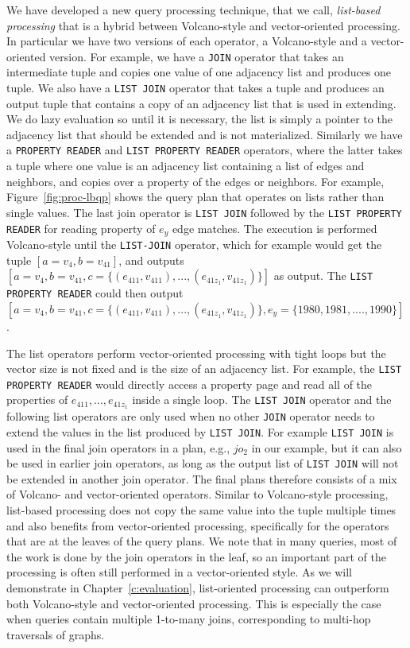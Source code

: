 We have developed a new query processing technique, that we call, {\em list-based processing} that is a hybrid between Volcano-style and vector-oriented processing. In particular we have two versions of each operator, a Volcano-style and a vector-oriented version. For example, we have a \texttt{JOIN} operator that takes an intermediate tuple and copies one value of one adjacency list and produces one tuple. We also have a \texttt{LIST JOIN} operator that takes a tuple and produces an output tuple that contains a copy of an adjacency list that is used in extending. We do lazy evaluation so until it is necessary, the list is simply a pointer to the adjacency list that should be extended and is not materialized. Similarly we have a \texttt{PROPERTY READER} and \texttt{LIST PROPERTY READER} operators, where the latter takes a tuple where one value is an adjacency list containing a list of edges and neighbors, and copies over a property of the edges or neighbors. For example, Figure~\ref{fig:proc-lbqp} shows the query plan that operates on lists rather than single values. The last join operator is \texttt{LIST JOIN} followed by the \texttt{LIST PROPERTY READER} for reading property of $e_y$ edge matches. The execution is performed Volcano-style until the \texttt{LIST-JOIN} operator, which for example would get the tuple $[a=v_4, b=v_{41}]$, and outputs $[a=v_4, b=v_{41}, c=\{(e_{411}, v_{411}), ..., (e_{41z_1}, v_{41z_1})\}]$ as output. The \texttt{LIST PROPERTY READER} could then output  $[a=v_4, b=v_{41}, c=\{(e_{411}, v_{411}), ..., (e_{41z_1}, v_{41z_1})\}, e_y=\{1980, 1981, ...., 1990\}]$. 

The list operators perform vector-oriented processing with tight loops but the vector size is not fixed and is the size of an adjacency list. For example, the \texttt{LIST PROPERTY READER} would directly access a property page and read all of the properties of $e_{411}, ..., e_{41z_1}$ inside a single loop. The \texttt{LIST JOIN} operator and the following list operators are only used when no other \texttt{JOIN} operator needs to extend the values in the list produced by \texttt{LIST JOIN}. For example \texttt{LIST JOIN} is used in the final join operators in a plan, e.g., $jo_2$ in our example, but it can also be used in earlier join operators, as long as the output list of \texttt{LIST JOIN} will not be extended in another join operator. The final plans therefore consists of a mix of Volcano- and vector-oriented operators. Similar to Volcano-style processing, list-based processing does not copy the same value into the tuple multiple times and also benefits from vector-oriented processing, specifically for the operators that are at the leaves of the query plans. We note that in many queries, most of the work is done by the join operators in the leaf, so an important part of the processing is often still performed in a vector-oriented style. As we will demonstrate in Chapter~\ref{c:evaluation}, list-oriented processing can outperform both Volcano-style and vector-oriented processing. This is especially the case when queries contain multiple 1-to-many joins, corresponding to multi-hop traversals of graphs.

